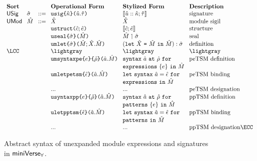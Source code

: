 \begin{figure}[p] 
\hspace{-5px}$\arraycolsep=4pt\begin{array}{lllllll}
\textbf{Sort} & & & \textbf{Operational Form} & \textbf{Stylized Form} & \textbf{Description}\\
\mathsf{USig} & \usigma & ::= & \ausignature{\ukappa}{\uu}{\utau} & \signature{\uu}{\ukappa}{\utau} & \text{signature}\\
\mathsf{UMod} & \uM & ::= & \uX & \uX & \text{module sigil}\\
&&& \austruct{\uc}{\ue} & \struct{\uc}{\ue} & \text{structure}\\
&&& \auseal{\usigma}{\uM} & \seal{\uM}{\usigma} & \text{seal}\\
&&& \aumlet{\usigma}{\uM}{\uX}{\uM} & \mlet{\uX}{\uM}{\uM}{\usigma} & \text{definition}\\
\LCC &&& \lightgray & \lightgray & \lightgray\\
&&& \aumdefpetsm{\urho}{e}{\tsmv}{\uM} & \texttt{syntax}~\tsmv~\texttt{at}~\urho~\texttt{for} & \text{peTSM definition}\\
&&&                                    & \texttt{expressions}~\{e\}~\texttt{in}~\uM\\
&&& \aumletpetsm{\uepsilon}{\tsmv}{\uM} & \texttt{let}~\texttt{syntax}~\tsmv=\uepsilon~\texttt{for} & \text{peTSM binding}\\
&&&                                  & \texttt{expressions}~\texttt{in}~\uM\\
&&& ... & ... & \text{peTSM designation}\\
&&& \audefpptsm{\urho}{e}{\tsmv}{\uM} & \texttt{syntax}~\tsmv~\texttt{at}~\urho~\texttt{for} & \text{ppTSM definition}\\
&&&                                    & \texttt{patterns}~\{e\}~\texttt{in}~\uM\\
&&& \auletpptsm{\uepsilon}{\tsmv}{\uM} & \texttt{let}~\texttt{syntax}~\tsmv=\uepsilon~\texttt{for} & \text{ppTSM binding}\\
&&& & \texttt{patterns}~\texttt{in}~\uM\\
&&& ... & ... & \text{ppTSM designation}\ECC
\end{array}$
\caption[Syntax of unexpanded module expressions and signatures in $\miniVerseParam$]{Abstract syntax of unexpanded module expressions and signatures in $\miniVerseParam$.}
\label{fig:P-unexpanded-modules-signatures}
\end{figure}


